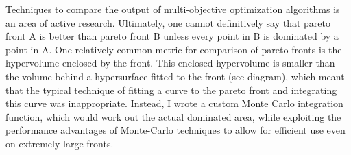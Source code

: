 Techniques to compare the output of multi-objective optimization algorithms is an area of active research. 
Ultimately, one cannot definitively say that pareto front A is better than pareto front B unless every point in B is dominated by a point in A. 
One relatively common metric for comparison of pareto fronts is the hypervolume enclosed by the front.
This enclosed hypervolume is smaller than the volume behind a hypersurface fitted to the front (see diagram), which meant that the typical technique of fitting a curve to the pareto front and integrating this curve was inappropriate. Instead, I wrote a custom Monte Carlo integration function, which would work out the actual dominated area, while exploiting the performance advantages of Monte-Carlo techniques to allow for efficient use even on extremely large fronts.
